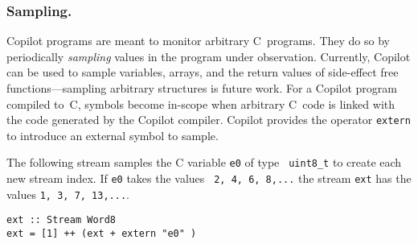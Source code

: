 \subsubsection{Sampling.}
Copilot programs are meant to monitor arbitrary C~programs.  They do
so by
periodically \emph{sampling} values in the program under observation.   Currently, Copilot can
be used to  sample variables, arrays,
and the return values of side-effect free functions---sampling arbitrary
structures is future work.  For a Copilot program compiled to~C, symbols become
in-scope when arbitrary C~code is linked with the code generated by the Copilot
compiler.  Copilot provides the operator {\tt extern} to introduce an external
symbol to sample.  %




The following stream samples the C variable {\tt e0} of type {\tt
  uint8\_t} to create each new stream index.  If {\tt e0} takes the values {\tt
 2, 4, 6, 8,...}  the stream {\tt ext} has the values {\tt 1, 3, 7, 13,...}.

\begin{lstlisting}[frame=single]
ext :: Stream Word8
ext = [1] ++ (ext + extern "e0" )
\end{lstlisting}
%

%
% 

%
%


